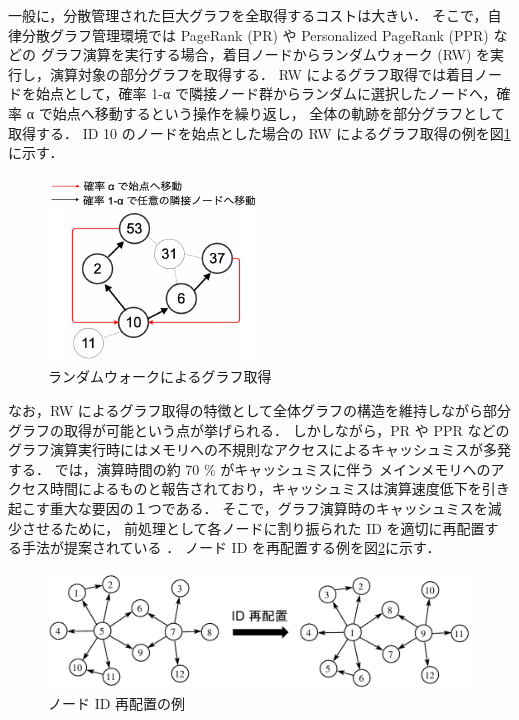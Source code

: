 一般に，分散管理された巨大グラフを全取得するコストは大きい．
そこで，自律分散グラフ管理環境では PageRank (PR) \cite{page1999pagerank} や Personalized PageRank (PPR) \cite{page1999pagerank} などの
グラフ演算を実行する場合，着目ノードからランダムウォーク (RW) を実行し，演算対象の部分グラフを取得する．
RW によるグラフ取得では着目ノードを始点として，確率 1-α で隣接ノード群からランダムに選択したノードへ，確率 α で始点へ移動するという操作を繰り返し，
全体の軌跡を部分グラフとして取得する．
ID 10 のノードを始点とした場合の RW によるグラフ取得の例を図\ref{RW_graph} に示す．
\begin{figure}[t]
  \centering
  \includegraphics[scale=1.8]{./figure/rw_graph_get.pdf}
  \caption{ランダムウォークによるグラフ取得}
  \label{RW_graph}
\end{figure}
なお，RW によるグラフ取得の特徴として全体グラフの構造を維持しながら部分グラフの取得が可能という点が挙げられる．
しかしながら，PR や PPR などのグラフ演算実行時にはメモリへの不規則なアクセスによるキャッシュミスが多発する．
\cite{wei2016speedup,zhang2017making} では，演算時間の約 70 \% がキャッシュミスに伴う
メインメモリへのアクセス時間によるものと報告されており，キャッシュミスは演算速度低下を引き起こす重大な要因の１つである．
そこで，グラフ演算時のキャッシュミスを減少させるために，
前処理として各ノードに割り振られた ID を適切に再配置する手法が提案されている \cite{wei2016speedup,zhang2017making,balaji2018graph,arai2016rabbit,lakhotia2017recall,faldu2019closer}．
ノード ID を再配置する例を図\ref{reordering_intro}に示す．
\begin{figure}[t]
  \centering
  \includegraphics[width=\linewidth]{./figure/reordering_intro.pdf}
  \caption{ノード ID 再配置の例}
  \label{reordering_intro}
\end{figure}

